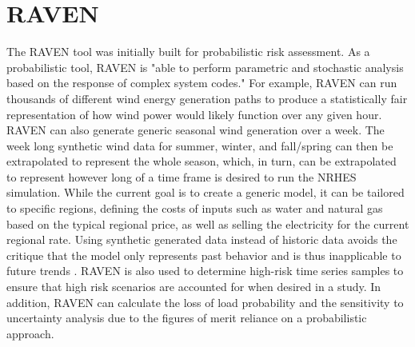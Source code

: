 \documentclass[12pt]{UIdahoMastersThesis}
\begin{document}
\section{RAVEN}
The RAVEN tool was initially built for probabilistic risk assessment. As a probabilistic tool, RAVEN is "able to perform parametric and stochastic analysis based on the response of complex system codes\cite{RabitiRAVEN}." For example, RAVEN can run thousands of different wind energy generation paths to produce a statistically fair representation of how wind power would likely function over any given hour. RAVEN can also generate generic seasonal wind generation over a week. The week long synthetic wind data for summer, winter, and fall/spring can then be extrapolated to represent the whole season, which, in turn, can be extrapolated to represent however long of a time frame is desired to run the NRHES simulation. While the current goal is to create a generic model, it can be tailored to specific regions, defining the costs of inputs such as water and natural gas based on the typical regional price, as well as selling the electricity for the current regional rate. Using synthetic generated data instead of historic data avoids the critique that the model only represents past behavior and is thus inapplicable to future trends \cite{redfoot_epiney_2016}. RAVEN is also used to determine high-risk time series samples to ensure that high risk scenarios are accounted for when desired in a study. In addition, RAVEN can calculate the loss of load probability and the sensitivity to uncertainty analysis due to the figures of merit reliance on a probabilistic approach.
\end{document}
